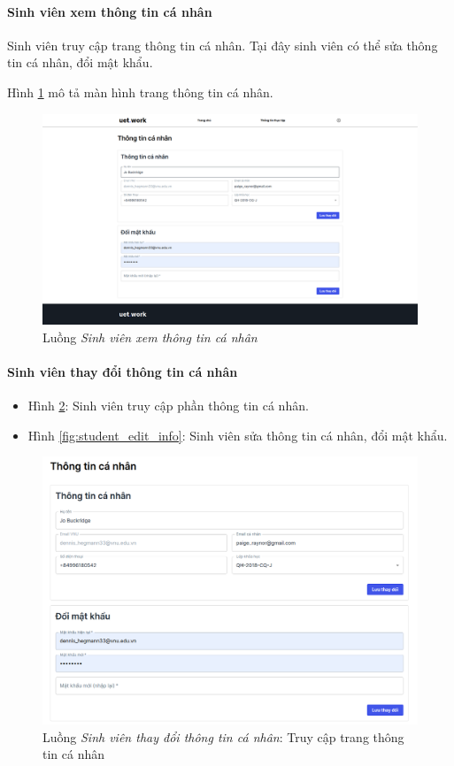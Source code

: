 \documentclass[./../main.tex]{subfiles}
\begin{document}
\paragraph*{Sinh viên xem thông tin cá nhân}
Sinh viên truy cập trang thông tin cá nhân. Tại đây sinh viên có thể sửa thông tin cá nhân, đổi mật khẩu.

Hình \ref{fig:view_info_page} mô tả màn hình trang thông tin cá nhân.

\begin{figure}[]
	\includegraphics[width=\linewidth]{./images/image44.png}
	\caption{Luồng \emph{Sinh viên xem thông tin cá nhân}}
	\label{fig:view_info_page}
\end{figure}

\paragraph*{Sinh viên thay đổi thông tin cá nhân}

\begin{itemize}
	\item Hình \ref{fig:student_access_info}: Sinh viên truy cập phần thông tin cá nhân.
	\item Hình \ref{fig:student_edit_info}: Sinh viên sửa thông tin cá nhân, đổi mật khẩu.
\end{itemize}

\begin{figure}[]
	\includegraphics[width=\linewidth]{./images/image45.png}
	\caption{Luồng \emph{Sinh viên thay đổi thông tin cá nhân}: Truy cập trang thông tin cá nhân}
	\label{fig:student_access_info}
\end{figure}
\end{document}

